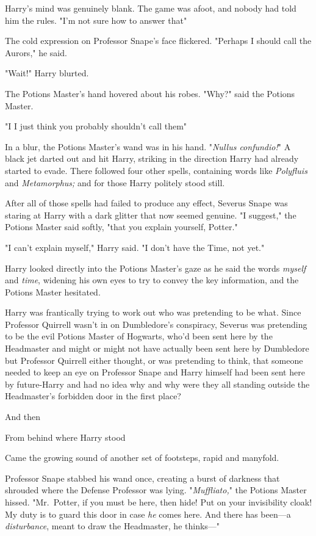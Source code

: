 Harry's mind was genuinely blank. The game was afoot, and nobody had told him
the rules. "I'm not sure how to answer that{\el}"

The cold expression on Professor Snape's face flickered. "Perhaps I should call
the Aurors," he said.

"Wait!" Harry blurted.

The Potions Master's hand hovered about his robes. "Why?" said the Potions
Master.

"I{\el} I just think you probably shouldn't call them{\el}"

In a blur, the Potions Master's wand was in his hand. "\emph{Nullus
confundio!}" A black jet darted out and hit Harry, striking in the direction
Harry had already started to evade. There followed four other spells,
containing words like \emph{Polyfluis} and \emph{Metamorphus;} and for those
Harry politely stood still.

After all of those spells had failed to produce any effect, Severus Snape was
staring at Harry with a dark glitter that now seemed genuine. "I suggest," the
Potions Master said softly, "that you explain yourself, Potter."

"I can't explain myself," Harry said. "I don't have the Time, not yet."

Harry looked directly into the Potions Master's gaze as he said the words
\emph{myself} and \emph{time}, widening his own eyes to try to convey the key
information, and the Potions Master hesitated.

Harry was frantically trying to work out who was pretending to be what. Since
Professor Quirrell wasn't in on Dumbledore's conspiracy, Severus was pretending
to be the evil Potions Master of Hogwarts, who'd been sent here by the
Headmaster{\el} and might or might not have actually been sent here by
Dumbledore{\el} but Professor Quirrell either thought, or was pretending to
think, that someone needed to keep an eye on Professor Snape{\el} and Harry
himself had been sent here by future-Harry and had no idea why{\el} and why
were they all standing outside the Headmaster's forbidden door in the first
place?

And then{\el}

From behind where Harry stood{\el}

Came the growing sound of another set of footsteps, rapid and manyfold.

Professor Snape stabbed his wand once, creating a burst of darkness that
shrouded where the Defense Professor was lying. "\emph{Muffliato,}" the Potions
Master hissed. "Mr.~Potter, if you must be here, then hide! Put on your
invisibility cloak! My duty is to guard this door in case \emph{he} comes here.
And there has been—a \emph{disturbance}, meant to draw the Headmaster, he
thinks—"

